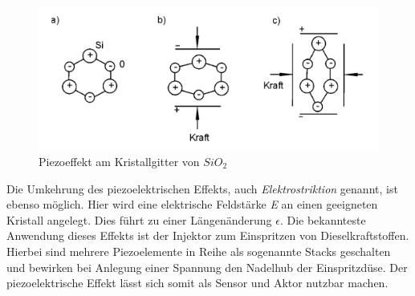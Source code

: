 \begin{figure}[H]
   \centering
    \includegraphics[scale=0.6]{Bilder/Piezoeffekt.png}
    \caption[Darstellung des Piezoeffekts]{Piezoeffekt am Kristallgitter von $SiO_2$ \footnotemark}
    \label{fig:piezoeffekt}
\end{figure}
Die Umkehrung des piezoelektrischen Effekts, auch \textit{Elektrostriktion} genannt, ist ebenso möglich. Hier wird eine elektrische Feldstärke \textit{E} an einen geeigneten Kristall angelegt. Dies führt zu einer Längenänderung \textit{$\epsilon$}. \autocite[vgl.][274]{Physik} Die bekannteste Anwendung dieses Effekts ist der Injektor zum Einspritzen von Dieselkraftstoffen. Hierbei sind mehrere Piezoelemente in Reihe als sogenannte Stacks geschalten und bewirken bei Anlegung einer Spannung den Nadelhub der Einspritzdüse. Der piezoelektrische Effekt lässt sich somit als Sensor und Aktor nutzbar machen. 
